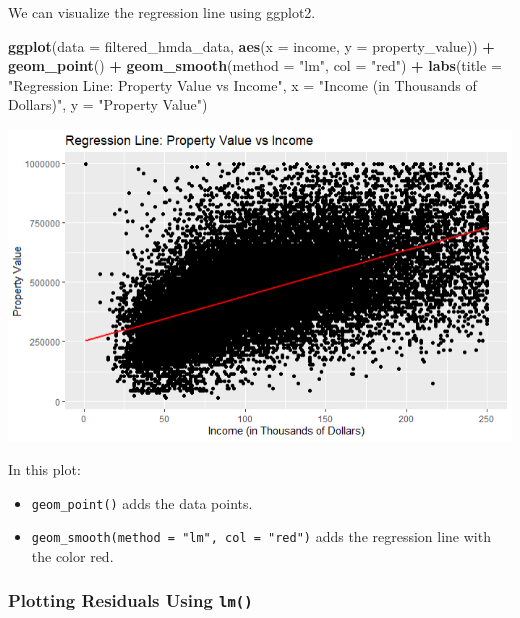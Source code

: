 \documentclass[
]{book}
\newenvironment{Shaded}{\begin{snugshade}}{\end{snugshade}}
\newcommand{\AttributeTok}[1]{\textcolor[rgb]{0.13,0.29,0.53}{#1}}
\newcommand{\FunctionTok}[1]{\textcolor[rgb]{0.13,0.29,0.53}{\textbf{#1}}}
\newcommand{\NormalTok}[1]{#1}
\newcommand{\SpecialCharTok}[1]{\textcolor[rgb]{0.81,0.36,0.00}{\textbf{#1}}}
\newcommand{\StringTok}[1]{\textcolor[rgb]{0.31,0.60,0.02}{#1}}
\begin{document}
We can visualize the regression line using ggplot2.

\begin{Shaded}
\begin{Highlighting}[]
\FunctionTok{ggplot}\NormalTok{(}\AttributeTok{data =}\NormalTok{ filtered\_hmda\_data, }\FunctionTok{aes}\NormalTok{(}\AttributeTok{x =}\NormalTok{ income, }\AttributeTok{y =}\NormalTok{ property\_value)) }\SpecialCharTok{+}
  \FunctionTok{geom\_point}\NormalTok{() }\SpecialCharTok{+}
  \FunctionTok{geom\_smooth}\NormalTok{(}\AttributeTok{method =} \StringTok{"lm"}\NormalTok{, }\AttributeTok{col =} \StringTok{"red"}\NormalTok{) }\SpecialCharTok{+}
  \FunctionTok{labs}\NormalTok{(}\AttributeTok{title =} \StringTok{"Regression Line: Property Value vs Income"}\NormalTok{,}
       \AttributeTok{x =} \StringTok{"Income (in Thousands of Dollars)"}\NormalTok{,}
       \AttributeTok{y =} \StringTok{"Property Value"}\NormalTok{)}
\end{Highlighting}
\end{Shaded}

\includegraphics{images/scatter_plot_with_regression.PNG}

In this plot:

\begin{itemize}
\item
  \texttt{geom\_point()} adds the data points.
\item
  \texttt{geom\_smooth(method\ =\ "lm",\ col\ =\ "red")} adds the regression line with the color red.
\end{itemize}

\hypertarget{plotting-residuals-using-lm}{%
\subsubsection*{\texorpdfstring{Plotting Residuals Using \texttt{lm()}}{Plotting Residuals Using lm()}}\label{plotting-residuals-using-lm}}
\end{document}
